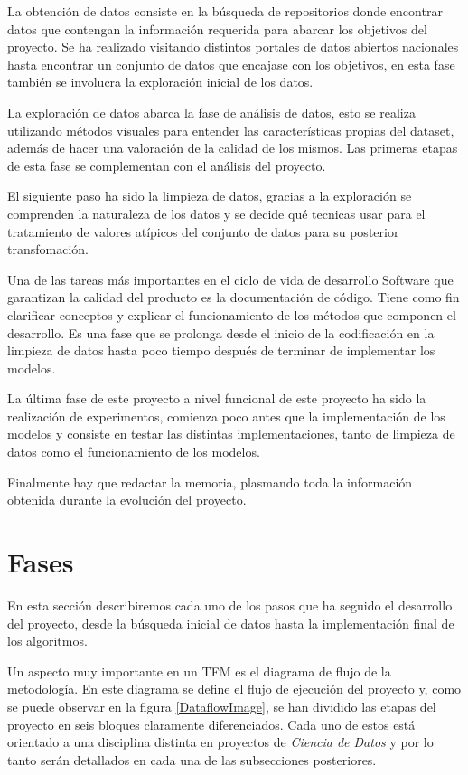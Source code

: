La obtención de datos consiste en la búsqueda de repositorios donde encontrar datos que contengan la información requerida para abarcar los objetivos del proyecto. Se ha realizado visitando distintos portales de datos abiertos nacionales hasta encontrar un conjunto de datos que encajase con los objetivos, en esta fase también se involucra la exploración inicial de los datos.

La exploración de datos abarca la fase de análisis de datos, esto se realiza utilizando métodos visuales para entender las características propias del dataset, además de hacer una valoración de la calidad de los mismos. Las primeras etapas de esta fase se complementan con el análisis del proyecto.

El siguiente paso ha sido la limpieza de datos, gracias a la exploración se comprenden la naturaleza de los datos y se decide qué tecnicas usar para el tratamiento de valores atípicos del conjunto de datos para su posterior transfomación.

Una de las tareas más importantes en el ciclo de vida de desarrollo Software que garantizan la calidad del producto es la documentación de código. Tiene como fin
clarificar conceptos y explicar el funcionamiento de los métodos que componen el desarrollo. Es una fase que se prolonga desde el inicio de la codificación en la limpieza de datos hasta poco tiempo después de terminar de implementar los modelos.

La última fase de este proyecto a nivel funcional de este proyecto ha sido la realización de experimentos, comienza poco antes que la implementación de los modelos y consiste en testar las distintas implementaciones, tanto de limpieza de datos como el funcionamiento de los modelos.

Finalmente hay que redactar la memoria, plasmando toda la información obtenida durante la evolución del proyecto.



\section{Fases}

    En esta sección describiremos cada uno de los pasos que ha seguido el desarrollo del proyecto, desde la búsqueda inicial de datos hasta la implementación final de los algoritmos.

    Un aspecto muy importante en un TFM es el diagrama de flujo de la metodología. En este diagrama se define el flujo de ejecución del proyecto y, como se puede observar en la figura \ref{DataflowImage}, se han dividido las etapas del proyecto en seis bloques claramente diferenciados. Cada uno de estos está orientado a una disciplina distinta en proyectos de \textit{Ciencia de Datos} y por lo tanto serán detallados en cada una de las subsecciones posteriores.


